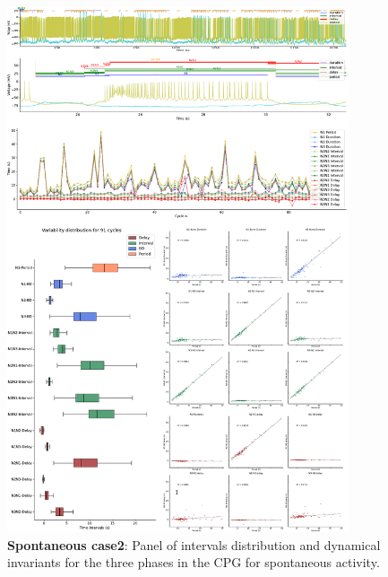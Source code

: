 \begin{figure}[htbp]
	\centering
	\includegraphics[width=0.9\textwidth]{./invariants/data/SUSSEX/prep2/images/3phases/panel_with_intervals.pdf}
	\caption{\textbf{Spontaneous case2}: Panel of intervals distribution and dynamical invariants for the three phases in the CPG for spontaneous activity.}
	\label{fig:prep2 invariants}
\end{figure}

